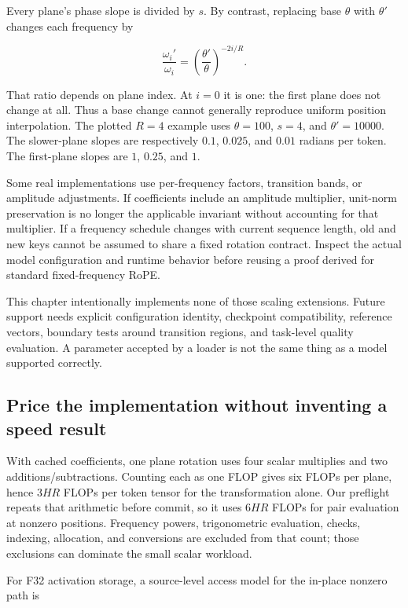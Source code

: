 \documentclass[
  10pt,
]{article}
\newcounter{none} %
\begin{document}
Every plane's phase slope is divided by \(s\). By contrast, replacing
base \(\theta\) with \(\theta'\) changes each frequency by

\[
\frac{\omega_i'}{\omega_i}
=\left(\frac{\theta'}{\theta}\right)^{-2i/R}.
\]

That ratio depends on plane index. At \(i=0\) it is one: the first plane
does not change at all. Thus a base change cannot generally reproduce
uniform position interpolation. The plotted \(R=4\) example uses
\(\theta=100\), \(s=4\), and \(\theta'=10000\). The slower-plane slopes
are respectively \(0.1\), \(0.025\), and \(0.01\) radians per token. The
first-plane slopes are \(1\), \(0.25\), and \(1\).

Some real implementations use per-frequency factors, transition bands,
or amplitude adjustments. If coefficients include an amplitude
multiplier, unit-norm preservation is no longer the applicable invariant
without accounting for that multiplier. If a frequency schedule changes
with current sequence length, old and new keys cannot be assumed to
share a fixed rotation contract. Inspect the actual model configuration
and runtime behavior before reusing a proof derived for standard
fixed-frequency RoPE.

This chapter intentionally implements none of those scaling extensions.
Future support needs explicit configuration identity, checkpoint
compatibility, reference vectors, boundary tests around transition
regions, and task-level quality evaluation. A parameter accepted by a
loader is not the same thing as a model supported correctly.

\subsection{Price the implementation without inventing a speed
result}\label{price-the-implementation-without-inventing-a-speed-result}

With cached coefficients, one plane rotation uses four scalar multiplies
and two additions/subtractions. Counting each as one FLOP gives six
FLOPs per plane, hence \(3HR\) FLOPs per token tensor for the
transformation alone. Our preflight repeats that arithmetic before
commit, so it uses \(6HR\) FLOPs for pair evaluation at nonzero
positions. Frequency powers, trigonometric evaluation, checks, indexing,
allocation, and conversions are excluded from that count; those
exclusions can dominate the small scalar workload.

For F32 activation storage, a source-level access model for the in-place
nonzero path is
\end{document}
